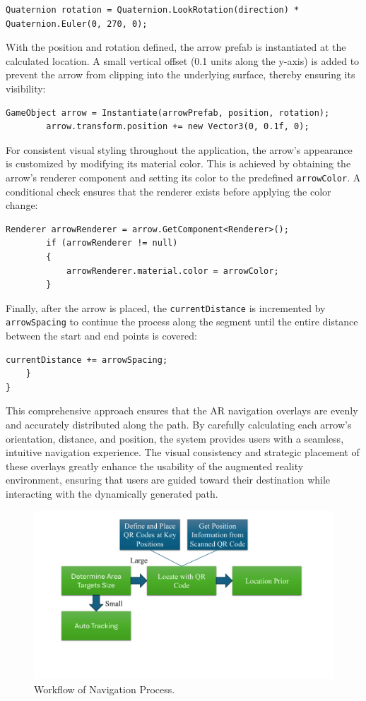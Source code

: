 \begin{lstlisting}[style=cSharp]
        Quaternion rotation = Quaternion.LookRotation(direction) * Quaternion.Euler(0, 270, 0);
\end{lstlisting}

With the position and rotation defined, the arrow prefab is instantiated at the calculated location. A small vertical offset (0.1 units along the y-axis) is added to prevent the arrow from clipping into the underlying surface, thereby ensuring its visibility:

\begin{lstlisting}[style=cSharp]
        GameObject arrow = Instantiate(arrowPrefab, position, rotation);
        arrow.transform.position += new Vector3(0, 0.1f, 0);
\end{lstlisting}

For consistent visual styling throughout the application, the arrow’s appearance is customized by modifying its material color. This is achieved by obtaining the arrow's renderer component and setting its color to the predefined \texttt{arrowColor}. A conditional check ensures that the renderer exists before applying the color change:

\begin{lstlisting}[style=cSharp]
        Renderer arrowRenderer = arrow.GetComponent<Renderer>();
        if (arrowRenderer != null)
        {
            arrowRenderer.material.color = arrowColor;
        }
\end{lstlisting}

Finally, after the arrow is placed, the \texttt{currentDistance} is incremented by \texttt{arrowSpacing} to continue the process along the segment until the entire distance between the start and end points is covered:

\begin{lstlisting}[style=cSharp]
        currentDistance += arrowSpacing;
    }
}
\end{lstlisting}

This comprehensive approach ensures that the AR navigation overlays are evenly and accurately distributed along the path. By carefully calculating each arrow's orientation, distance, and position, the system provides users with a seamless, intuitive navigation experience. The visual consistency and strategic placement of these overlays greatly enhance the usability of the augmented reality environment, ensuring that users are guided toward their destination while interacting with the dynamically generated path.

\begin{figure}[ht]
  \centering
  \includegraphics[scale=0.5]{content/resources/images/chap-problems-solutions/location-0.PNG}
  \caption{Workflow of Navigation Process.}
  \label{fig:navigation-0}
\end{figure}
